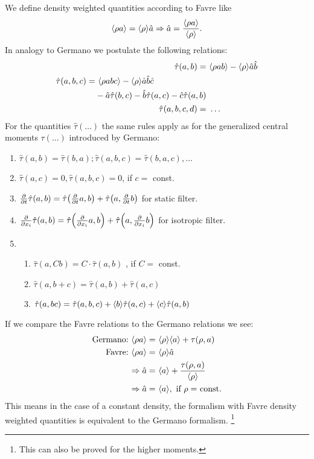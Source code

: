 We define density weighted quantities according to Favre like
\begin{align}
\langle \rho a \rangle = \langle \rho \rangle \hat{a} \Rightarrow \hat{a}=\frac{\langle \rho
a \rangle}{\langle \rho \rangle}.
\end{align}
In analogy to Germano we postulate the following relations:
\begin{align}
\hat{\tau}(a,b)=&\ \langle \rho a b \rangle - \langle \rho \rangle \hat{a} \hat {b}\\
\begin{split}
\hat{\tau}(a,b,c)=&\ \langle \rho a b c \rangle - \langle \rho \rangle \hat{a} \hat{b} \hat{c} \\
&-\hat{a}\hat{\tau}(b,c)-\hat{b}\hat{\tau}(a,c)-\hat{c}\hat{\tau}(a,b)
\end{split}
\\
\hat{\tau}(a,b,c,d)=&\ \ldots
\end{align}
For the quantities $\hat{\tau}(\ldots)$ the same rules apply as for the 
generalized central moments $\tau(\ldots)$ introduced by Germano:
\begin{enumerate}
\item $\hat{\tau}(a,b) = \hat{\tau}(b,a) ; \hat{\tau}(a,b,c)=\hat{\tau}(b,a,c) ,
\ldots$
\item $\hat{\tau}(a,c) = 0, \hat{\tau}(a,b,c) = 0$, if $c =$ const.
\item
$\frac{\partial}{\partial t}\hat{\tau}(a,b)=\hat{\tau}{ \left( \frac{\partial}{\partial t}a,b \right) }+\hat{\tau}{ \left( a,\frac{\partial}{\partial t}b \right) }$ 
for static filter.
\item
$\frac{\partial}{\partial x_i}\hat{\tau}(a,b)=\hat{\tau}{ \left( \frac{\partial}{\partial x_i}a,b \right) }+\hat{\tau}{ \left( a,\frac{\partial}{\partial x_i}b \right) }
$
for isotropic filter.
\item
\begin{enumerate} 
\item $\hat{\tau}(a,Cb) = C\cdot \hat{\tau}(a,b)$ , if $C =$ const.
\item $\hat{\tau}(a,b+c) = \hat{\tau}(a,b) + \hat{\tau}(a,c)$ 
\item $\hat{\tau}(a,bc) = \hat{\tau}(a,b,c) + \langle b \rangle\hat{\tau}(a,c) +
\langle c \rangle\hat{\tau}(a,b)$
\end{enumerate} 
\end{enumerate}
If we compare the Favre relations to the Germano relations we see:
\begin{align}
\text{Germano:}\ \langle \rho a \rangle =&\ \langle \rho \rangle\langle a \rangle + \tau(\rho,a)\\
\text{Favre:}\ \langle \rho a \rangle=&\ \langle \rho \rangle\hat{a}\\
\Rightarrow \hat{a}=&\ \langle a \rangle + \frac{\tau(\rho,a)}{\langle \rho \rangle}\\
\Rightarrow \hat{a}=&\ \langle a \rangle,\ \text{if $\rho =$ const.}
\end{align}
This means in the case of a constant density, the formalism with Favre density
weighted quantities
is equivalent to the Germano formalism.
\footnote{This can also be proved for the higher moments.}
